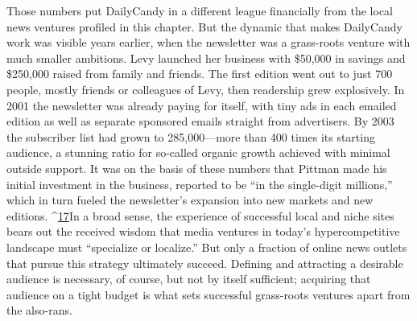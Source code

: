 Those numbers put DailyCandy in a different league financially from the local
news ventures profiled in this chapter. But the dynamic that makes DailyCandy
work was visible years earlier, when the newsletter was a grass-roots venture with
much smaller ambitions. Levy launched her business with \$50,000 in savings and
\$250,000 raised from family and friends. The first edition went out to just 700
people, mostly friends or colleagues of Levy, then readership grew explosively. In
2001 the newsletter was already paying for itself, with tiny ads in each emailed
edition as well as separate sponsored emails straight from advertisers.
By 2003 the subscriber list had grown to 285,000—more than 400 times its
starting audience, a stunning ratio for so-called organic growth achieved with
minimal outside support. It was on the basis of these numbers that Pittman
made his initial investment in the business, reported to be ``in the single-digit
millions,'' which in turn fueled the newsletter's expansion into new markets
and new editions. ^{\href{#endnotes-chapter-3}{17}}In a broad sense, the experience of successful local and niche sites bears out
the received wisdom that media ventures in today's hypercompetitive landscape
must ``specialize or localize.'' But only a fraction of online news outlets that pursue
this strategy ultimately succeed. Defining and attracting a desirable audience
is necessary, of course, but not by itself sufficient; acquiring that audience on a
tight budget is what sets successful grass-roots ventures apart from the also-rans.


